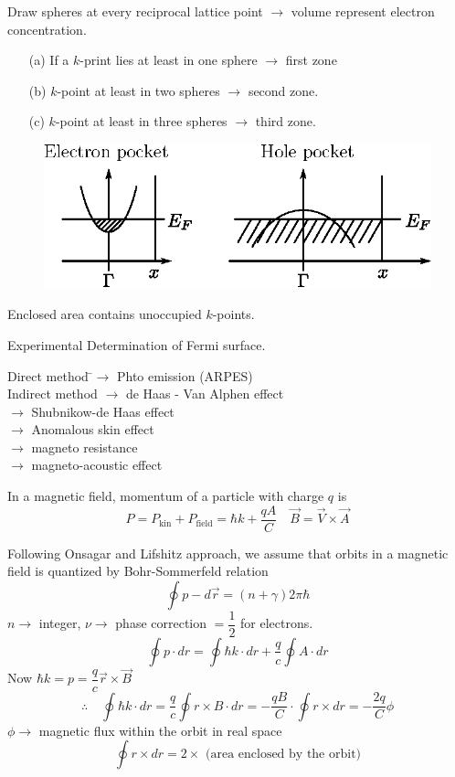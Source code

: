 Draw spheres at every reciprocal lattice point $\to$ volume represent electron concentration.
\begin{itemize}
\itemsep=0pt
\item[(a)] If a $k$-print lies at least in one sphere $\to$ first zone

\item[(b)] $k$-point at least in two spheres $\to$ second zone.

\item[(c)] $k$-point at least in three spheres $\to$ third zone.
\end{itemize}
\begin{figure}[H]
\centering
\includegraphics{images/lecture24/fig11.eps}
\end{figure}

Enclosed area contains unoccupied $k$-points.

Experimental Determination of Fermi surface.
\begin{tabbing}
\phantom{N}Direct method \=$\to$ Phto emission (ARPES)\\[4pt]
Indirect method \>$\to$ de Haas - Van Alphen effect\\[4pt]
                \>$\to$ Shubnikow-de Haas effect\\[4pt]
                \>$\to$ Anomalous skin effect\\[4pt]
                \>$\to$ magneto resistance\\[4pt]
                \>$\to$ magneto-acoustic effect
\end{tabbing}

In a magnetic field, momentum of a particle with charge $q$ is
$$
P=P_{\text{kin}}+P_{\text{field}}=\hbar k+\dfrac{qA}{C}\quad \overrightarrow{B}=\overrightarrow{V}\times \overrightarrow{A}
$$

Following Onsagar and Lifshitz approach, we assume that orbits in a magnetic field is quantized by Bohr-Sommerfeld relation
$$
\oint p-d\overrightarrow{r}=(n+\gamma)2\pi \hbar
$$
$n\to$ integer, $\nu\to$ phase correction $=\dfrac{1}{2}$ for electrons.
$$
\oint p\cdot dr=\oint \hbar k\cdot dr+\dfrac{q}{c}\oint A\cdot dr
$$
Now $\hbar k=p=\dfrac{q}{c}\overrightarrow{r}\times \overrightarrow{B}$
$$
\therefore\quad \oint \hbar k\cdot dr=\dfrac{q}{c}\oint r\times B\cdot dr=-\dfrac{qB}{C}\cdot \oint r\times dr=-\dfrac{2q}{C}\phi
$$
$\phi\to$ magnetic flux within the orbit in real space
$$
\oint r\times dr = 2\times \text{ (area enclosed by the orbit)}
$$

